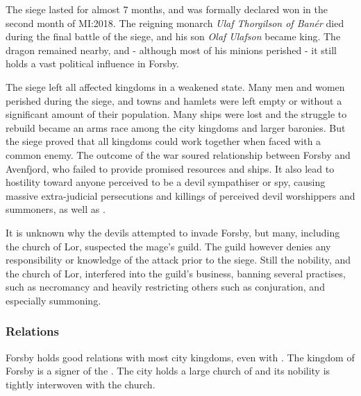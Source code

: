 The siege lasted for almost 7 months, and was formally declared won in the
second month of MI:2018. The reigning monarch \emph{Ulaf Thorgilson of Banér}
died during the final battle of the siege, and his son \emph{Olaf Ulafson}
became king. The dragon remained nearby, and - although most of his minions
perished - it still holds a vast political influence in Forsby.

The siege left all affected kingdoms in a weakened state. Many men and women
perished during the siege, and towns and hamlets were left empty or without
a significant amount of their population. Many ships were lost and the
struggle to rebuild became an arms race among the city kingdoms and larger
baronies. But the siege proved that all kingdoms could work together when
faced with a common enemy. The outcome of the war soured relationship between
Forsby and Avenfjord, who failed to provide promised resources and ships. It
also lead to hostility toward anyone perceived to be a devil sympathiser or
spy, causing massive extra-judicial persecutions and killings of perceived
devil worshippers and summoners, as well as .

It is unknown why the devils attempted to invade Forsby, but many, including
the church of Lor, suspected the mage's guild. The guild however denies any
responsibility or knowledge of the attack prior to the siege. Still the
nobility, and the church of Lor, interfered into the guild's business, banning
several practises, such as necromancy and heavily restricting others such as
conjuration, and especially summoning.

\subsubsection{Relations}

Forsby holds good relations with most city kingdoms, even with
. The kingdom of Forsby is a signer of the
. The city holds a large church of 
and its nobility is tightly interwoven with the church.

